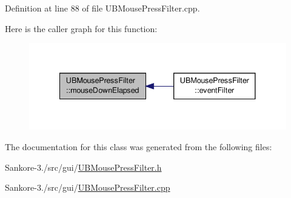 Definition at line 88 of file U\-B\-Mouse\-Press\-Filter.\-cpp.



Here is the caller graph for this function\-:
\nopagebreak
\begin{figure}[H]
\begin{center}
\leavevmode
\includegraphics[width=338pt]{d8/d58/class_u_b_mouse_press_filter_a4090719a1987b4e640c6cf0402bf1b6f_icgraph}
\end{center}
\end{figure}




The documentation for this class was generated from the following files\-:\begin{DoxyCompactItemize}
\item 
Sankore-\/3./src/gui/\hyperlink{_u_b_mouse_press_filter_8h}{U\-B\-Mouse\-Press\-Filter.\-h}\item 
Sankore-\/3./src/gui/\hyperlink{_u_b_mouse_press_filter_8cpp}{U\-B\-Mouse\-Press\-Filter.\-cpp}\end{DoxyCompactItemize}
